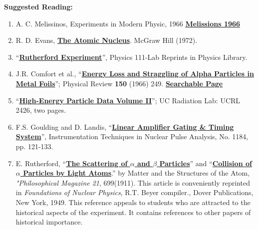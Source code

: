 \documentclass{../lab}
\begin{document}
\noindent\textbf{Suggested Reading:}

\begin{enumerate}
    \item A. C. Melissinos, Experiments in Modern Physic, 1966 \href{http://physics111.lib.berkeley.edu/Physics111/Reprints/RUT/RUT\%20\%20melissinos\%201966\%20rutherford\%20scattering.pdf}{\textbf{Melissions 1966}}

    \item R. D. Evans, \href{http://physics111.lib.berkeley.edu/Physics111/Reprints/R.D.Evans\%20Atomic\%20Nucleus/The\%20Atomic\%20Nucleus\%20Evans\%20full\%20text.pdf}{\textbf{The Atomic Nucleus}}. McGraw Hill (1972).

    \item ``\href{http://physics111.lib.berkeley.edu/Physics111/Reprints/RUT/03-Physics\_111\_Rutherford\_Scattering\_Experiment.pdf}{\textbf{Rutherford Experiment}}'', Physics 111-Lab Reprints in Physics Library.

    \item J.R. Comfort et al., ``\href{http://prola.aps.org/abstract/PR/v150/i1/p249\_1}{\textbf{Energy Loss and Straggling of Alpha Particles in Metal Foils}}''; Physical Review \textbf{150} (1966) 249. \href{http://physics111.lib.berkeley.edu/Physics111/Reprints/RUT/01-Energy\_Loss\_and\_Straggling.pdf}{\textbf{Searchable Page}}

    \item ``\href{http://physics111.lib.berkeley.edu/Physics111/Reprints/RUT/02-High\_Energy\_Particle\_Data.pdf}{\textbf{High-Energy Particle Data Volume II}}''; UC Radiation Lab: UCRL 2426, two pages.

    \item F.S. Goulding and D. Landis, ``\href{http://physics111.lib.berkeley.edu/Physics111/Reprints/RUT/04-Linear\_Amplifier.pdf}{\textbf{Linear Amplifier Gating \& Timing System}}'', Instrumentation Techniques in Nuclear Pulse Analysis, No. 1184, pp. 121-133.

    \item E. Rutherford, ``\href{http://physics111.lib.berkeley.edu/Physics111/Reprints/Beyer\_Foundations\%20of\%20Nuclear\%20Physics/The\%20scattering\%20of\%20a\%20and\%20b\%20particles\%20Rutherford.pdf}{\textbf{The Scattering of $ \alpha $ and $ \beta $ Particles}}'' and ``\href{http://physics111.lib.berkeley.edu/Physics111/Reprints/Beyer\_Foundations\%20of\%20Nuclear\%20Physics/Collision\%20of\%20a\%20particles\%20with\%20light\%20atoms\%20Rutherford.pdf}{\textbf{Collision of $ \alpha $ Particles by Light Atoms}}.'' by Matter and the Structures of the Atom, \emph{"Philosophical Magazine 21}, 699(1911). This article is conveniently reprinted in\emph{ Foundations of Nuclear Physics}, R.T. Beyer compiler., Dover Publications, New York, 1949. This reference appeals to students who are attracted to the historical aspects of the experiment. It contains references to other papers of historical importance.

\end{enumerate}
\end{document}
